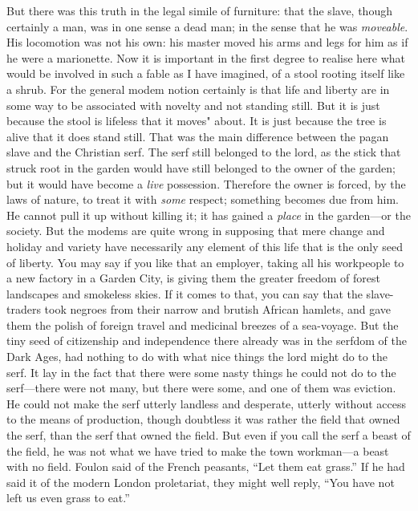 \documentclass{book}
\begin{document}
But there was this truth in the legal simile of furniture: that the slave, though certainly a man, was in one sense a dead man; in the sense that he was \emph{moveable}. His locomotion was not his own: his master moved his arms and legs for him as if he were a marionette. Now it is important in the first degree to realise here what would be involved in such a fable as I have imagined, of a stool rooting itself like a shrub. For the general modem notion certainly is that life and liberty are in some way to be associated with novelty and not standing still. But it is just because the stool is lifeless that it moves" about. It is just because the tree is alive that it does stand still. That was the main difference between the pagan slave and the Christian serf. The serf still belonged to the lord, as the stick that struck root in the garden would have still belonged to the owner of the garden; but it would have become a \emph{live} possession. Therefore the owner is forced, by the laws of nature, to treat it with \emph{some} respect; something becomes due from him. He cannot pull it up without killing it; it has gained a \emph{place} in the garden—or the society. But the modems are quite wrong in supposing that mere change and holiday and variety have necessarily any element of this life that is the only seed of liberty. You may say if you like that an employer, taking all his workpeople to a new factory in a Garden City, is giving them the greater freedom of forest landscapes and smokeless skies. If it comes to that, you can say that the slave-traders took negroes from their narrow and brutish African hamlets, and gave them the polish of foreign travel and medicinal breezes of a sea-voyage. But the tiny seed of citizenship and independence there already was in the serfdom of the Dark Ages, had nothing to do with what nice things the lord might do to the serf. It lay in the fact that there were some nasty things he could not do to the serf—there were not many, but there were some, and one of them was eviction. He could not make the serf utterly landless and desperate, utterly without access to the means of production, though doubtless it was rather the field that owned the serf, than the serf that owned the field. But even if you call the serf a beast of the field, he was not what we have tried to make the town workman—a beast with no field. Foulon said of the French peasants, “Let them eat grass.” If he had said it of the modern London proletariat, they might well reply, “You have not left us even grass to eat.”
\end{document}
